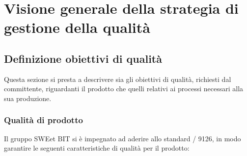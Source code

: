 \section{Visione generale della strategia di gestione della qualità}
  \subsection{Definizione obiettivi di qualità}
  Questa sezione si presta a descrivere sia gli obiettivi di qualità, richiesti dal committente, riguardanti il prodotto
  che quelli relativi ai processi necessari alla sua produzione.
    \subsubsection{Qualità di prodotto}
    Il gruppo SWEet BIT si è impegnato ad aderire allo standard / 9126, in modo garantire
    le seguenti caratteristiche di qualità per il prodotto:
